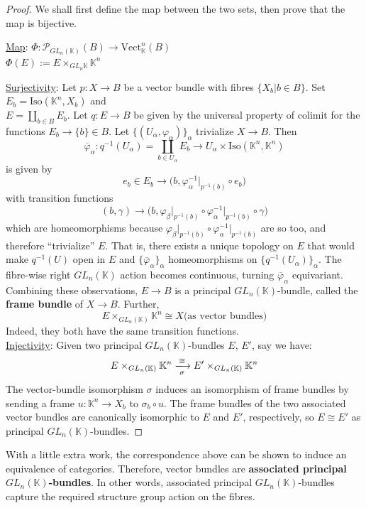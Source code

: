 \documentclass[11pt,a4paper]{article}
\begin{document}
\begin{proof}
    We shall first define the map between the two sets, then prove that the map is bijective.

    \underline{Map}:  $
\Phi: \mathcal{P}_{GL_n(\mathbb{K})}(B) \rightarrow \text{Vect}_{\mathbb{K}}^n(B)
    $\\
     $\Phi(E):= E\times_{GL_n{\mathbb{K}}}\mathbb{K}^n$


\underline{Surjectivity}: Let $p: X \rightarrow B$ be a vector bundle with fibres $\{X_b |  b\in B\}$. Set $E_b = \text{Iso}(\mathbb{K}^n, X_b)$ and\\ $E= \coprod\limits_{b \in B}E_b$. Let $q:E\rightarrow B$ be given by the universal property of colimit for the functions $E_b \rightarrow \{b\}\in B$. Let $\{(U_{\alpha}, \varphi_{\alpha})\}_{\alpha}$ trivialize $X\rightarrow B$. Then $$\overline{\varphi}_{\alpha}: q^{-1}(U_{\alpha}) = \coprod\limits_{b\in U_{\alpha}}E_b \rightarrow U_{\alpha}\times \text{Iso}(\mathbb{K}^n, \mathbb{K}^n)$$
is given by $$e_b \in E_b \rightarrow \bigg(b, \varphi_{\alpha}^{-1}\big|_{p^{-1}(b)}\circ e_b\bigg)$$
with transition functions
$$(b, \gamma) \rightarrow \bigg(b, \varphi_{\beta}\big|_{p^{-1}(b)}\circ \varphi_{\alpha}^{-1}\big|_{p^{-1}(b)}\circ \gamma\bigg)$$
which are homeomorphisms because $\varphi_{\beta}\big|_{p^{-1}(b)}\circ \varphi_{\alpha}^{-1}\big|_{p^{-1}(b)}$ are so too, and therefore ``trivialize'' $E$. That is, there exists a unique topology on $E$ that would make $q^{-1}(U)$ open in $E$ and $\{\overline{\varphi}_{\alpha}\}_{\alpha}$ homeomorphisms on $\{q^{-1}(U_{\alpha})\}_{\alpha}$. The fibre-wise right $GL_n(\mathbb{K})$ action becomes continuous, turning $\overline{\varphi}_{\alpha}$ equivariant. Combining these observations, $E\rightarrow B$ is a principal $GL_n(\mathbb{K})$-bundle, called the \textbf{frame bundle} of $X\rightarrow B$. Further,
$$E\times_{GL_n(\mathbb{K})} \mathbb{K}^n \cong X   \text{(as vector bundles)}$$
Indeed, they both have the same transition functions.\\

\underline{Injectivity}: Given two principal $GL_n(\mathbb{K})$-bundles $E$, $E'$, say we have:
$$E\times_{GL_n(\mathbb{K})} \mathbb{K}^n \xlongrightarrow[\sigma]{\cong} E'\times_{GL_n(\mathbb{K})} \mathbb{K}^n$$
The vector-bundle isomorphism $\sigma$ induces an isomorphism of frame bundles by sending a frame $u:\mathbb K^n\to X_b$ to $\sigma_b\circ u$. The frame bundles of the two associated vector bundles are canonically isomorphic to $E$ and $E'$, respectively, so $E\cong E'$ as principal $GL_n(\mathbb K)$-bundles.
\end{proof}

With a little extra work, the correspondence above can be shown to induce an equivalence of categories. Therefore, vector bundles are \textbf{associated principal $GL_n(\mathbb{K})$-bundles}. In other words, associated principal $GL_n(\mathbb{K})$-bundles capture the required structure group action on the fibres.


\end{document}
